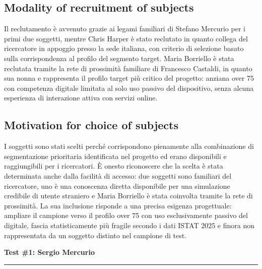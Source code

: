 ﻿\documentclass[11pt,a4paper]{article}
\begin{document}
\subsection*{Modality of recruitment of subjects}
\label{sec:recruitment-modality-client}
\begin{tcolorbox}[base]
Il reclutamento è avvenuto grazie ai legami familiari di Stefano Mercurio per i primi due soggetti, mentre Chris Harper è stato reclutato in quanto collega del ricercatore in appoggio presso la sede italiana, con criterio di selezione basato sulla corrispondenza al profilo del segmento target. Maria Borriello è stata reclutata tramite la rete di prossimità familiare di Francesco Castaldi, in quanto sua nonna e rappresenta il profilo target più critico del progetto: anziana over 75 con competenza digitale limitata al solo uso passivo del dispositivo, senza alcuna esperienza di interazione attiva con servizi online.
\end{tcolorbox}
\vspace{0.2cm}

\subsection*{Motivation for choice of subjects}
\label{sec:recruitment-motivation-client}
\begin{tcolorbox}[base]
I soggetti sono stati scelti perché corrispondono pienamente
alla combinazione di segmentazione prioritaria identificata
nel progetto ed erano disponibili e raggiungibili per i
ricercatori. È onesto riconoscere che la scelta è stata
determinata anche dalla facilità di accesso: due soggetti
sono familiari del ricercatore, uno è una conoscenza
diretta disponibile per una simulazione credibile di
utente straniero e Maria Borriello è stata coinvolta
tramite la rete di prossimità. La sua inclusione risponde
a una precisa esigenza progettuale: ampliare il campione
verso il profilo over 75 con uso esclusivamente passivo
del digitale, fascia statisticamente più fragile secondo
i dati ISTAT 2025 e finora non rappresentata da un soggetto
distinto nel campione di test.
\end{tcolorbox}


\newpage
\begin{center}
  {\color{primaryColor}\large\bfseries Test \#1: Sergio Mercurio}\\
  \vspace{0.1cm}
  \color{borderColor}\hrule
\end{center}
\end{document}
